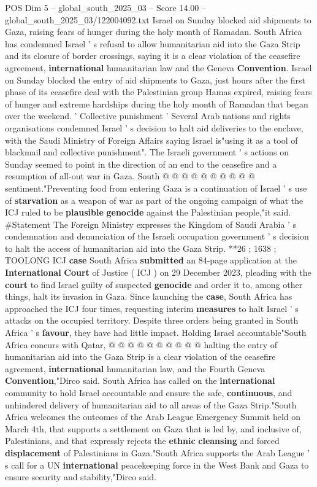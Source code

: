 \begin{textsample}{POS Dim 5 – global\_south\_2025\_03 – Score 14.00 – global\_south\_2025\_03/122004092.txt}  \label{ex:f5_pos_186}
Israel on Sunday blocked aid shipments to Gaza, raising fears of hunger during the holy month of Ramadan.
South Africa has condemned Israel ' s refusal to allow humanitarian aid into the Gaza Strip and its closure of border crossings, saying it is a clear violation of the ceasefire agreement, \textbf{international} humanitarian law and the Geneva \textbf{Convention}.
Israel on Sunday blocked the entry of aid shipments to Gaza, just hours after the first phase of its ceasefire deal with the Palestinian group Hamas expired, raising fears of hunger and extreme hardships during the holy month of Ramadan that began over the weekend. ' Collective punishment ' Several Arab nations and rights organisations condemned Israel ' s decision to halt aid deliveries to the enclave, with the Saudi Ministry of Foreign Affairs saying Israel is"using it as a tool of blackmail and collective punishment".
The Israeli government ' s actions on Sunday seemed to point in the direction of an end to the ceasefire and a resumption of all-out war in Gaza.
South @ @ @ @ @ @ @ @ @ @ sentiment."Preventing food from entering Gaza is a continuation of Israel ' s use of \textbf{starvation} as a weapon of war as part of the ongoing campaign of what the ICJ ruled to be \textbf{plausible} \textbf{genocide} against the Palestinian people,"it said. \#Statement The Foreign Ministry expresses the Kingdom of Saudi Arabia ' s condemnation and denunciation of the Israeli occupation government ' s decision to halt the access of humanitarian aid into the Gaza Strip. **26 ; 1638 ; TOOLONG ICJ \textbf{case} South Africa \textbf{submitted} an 84-page application at the \textbf{International} \textbf{Court} of Justice ( ICJ ) on 29 December 2023, pleading with the \textbf{court} to find Israel guilty of suspected \textbf{genocide} and order it to, among other things, halt its invasion in Gaza.
Since launching the \textbf{case}, South Africa has approached the ICJ four times, requesting interim \textbf{measures} to halt Israel ' s attacks on the occupied territory.
Despite three orders being granted in South Africa ' s \textbf{favour}, they have had little impact.
Holding Israel accountable"South Africa concurs with Qatar, @ @ @ @ @ @ @ @ @ @ halting the entry of humanitarian aid into the Gaza Strip is a clear violation of the ceasefire agreement, \textbf{international} humanitarian law, and the Fourth Geneva \textbf{Convention},"Dirco said.
South Africa has called on the \textbf{international} community to hold Israel accountable and ensure the safe, \textbf{continuous}, and unhindered delivery of humanitarian aid to all areas of the Gaza Strip."South Africa welcomes the outcomes of the Arab League Emergency Summit held on March 4th, that supports a settlement on Gaza that is led by, and inclusive of, Palestinians, and that expressly rejects the \textbf{ethnic} \textbf{cleansing} and forced \textbf{displacement} of Palestinians in Gaza."South Africa supports the Arab League ' s call for a UN \textbf{international} peacekeeping force in the West Bank and Gaza to ensure security and stability,"Dirco said.


\end{textsample}
